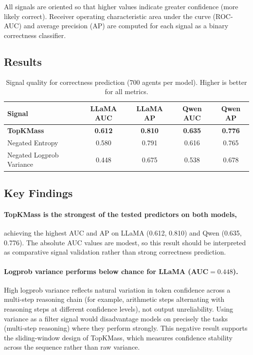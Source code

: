 \documentclass[11pt]{article}
\begin{document}
All signals are oriented so that higher values indicate greater confidence (more
likely correct). Receiver operating characteristic area under the curve
(ROC-AUC) and average precision (AP) are computed for each signal as a binary
correctness classifier.

\subsection{Results}
\label{sec:exp2-results}

\begin{table}[h]
\centering
\caption{Signal quality for correctness prediction (700 agents per model).
  Higher is better for all metrics.}
\label{tab:signal-quality}
\small
\begin{tabular}{lcccc}
\toprule
\textbf{Signal}
  & \textbf{LLaMA AUC} & \textbf{LLaMA AP}
  & \textbf{Qwen AUC}  & \textbf{Qwen AP} \\
\midrule
\textbf{TopKMass}        & \textbf{0.612} & \textbf{0.810} & \textbf{0.635} & \textbf{0.776} \\
Negated Entropy          & 0.580 & 0.791 & 0.616 & 0.765 \\
Negated Logprob Variance & 0.448 & 0.675 & 0.538 & 0.678 \\
\bottomrule
\end{tabular}
\end{table}

\subsection{Key Findings}
\label{sec:exp2-findings}

\paragraph{TopKMass is the strongest of the tested predictors on both models,}
achieving the highest AUC and AP on LLaMA (0.612, 0.810) and Qwen (0.635,
0.776). The absolute AUC values are modest, so this result should be interpreted
as comparative signal validation rather than strong correctness prediction.

\paragraph{Logprob variance performs below chance for LLaMA (AUC$=0.448$).}
High logprob variance reflects natural variation in token confidence across a
multi-step reasoning chain (for example, arithmetic steps alternating with
reasoning steps at different confidence levels), not output unreliability. Using
variance as a filter signal would disadvantage models on precisely the tasks
(multi-step reasoning) where they perform strongly. This negative result
supports the sliding-window design of TopKMass, which measures confidence
stability across the sequence rather than raw variance.
\end{document}

